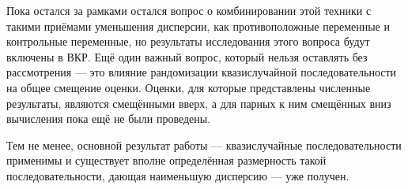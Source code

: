\documentclass[specialist,
               substylefile = ../spbu.rtx,
               subf,href,colorlinks=true, 12pt]{disser}
\newcommand{\Vhat}{\hat{V}}
\DeclareMathOperator{\correlation}{cor}
\newcommand{\corr}[2]{\correlation\left(#1, #2\right)}
\begin{document}
Пока остался за рамками остался вопрос о комбинировании этой техники с такими приёмами уменьшения дисперсии, как противоположные переменные и контрольные переменные, но результаты исследования этого вопроса будут включены в ВКР. Ещё один важный вопрос, который нельзя оставлять без рассмотрения --- это влияние рандомизации квазислучайной последовательности на общее смещение оценки. Оценки, для которые представлены численные результаты, являются смещёнными вверх, а для парных к ним смещённых вниз вычисления пока ещё не были проведены.

Тем не менее, основной результат работы --- квазислучайные последовательности применимы и существует вполне определённая размерность такой последовательности, дающая наименьшую дисперсию --- уже получен.




\end{document}
